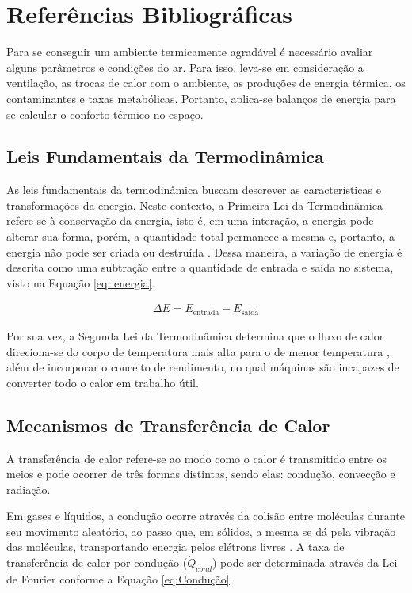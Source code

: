 \documentclass[acronym,symbols,table]{fei}
\begin{document}
\chapter{Referências Bibliográficas}

Para se conseguir um ambiente termicamente agradável é necessário avaliar alguns parâmetros e condições do ar. Para isso, leva-se em consideração a ventilação, as trocas de calor com o ambiente, as produções de energia térmica, os contaminantes e taxas metabólicas. Portanto, aplica-se balanços de energia para se calcular o conforto térmico no espaço.

\section{Leis Fundamentais da Termodinâmica} 

As leis fundamentais da termodinâmica buscam descrever as características e transformações da energia. Neste contexto, a Primeira Lei da Termodinâmica refere-se à conservação da energia, isto é, em uma interação, a energia pode alterar sua forma, porém, a quantidade total permanece a mesma e, portanto, a energia não pode ser criada ou destruída \cite{cengel1998heat}. Dessa maneira, a variação de energia é descrita como uma subtração entre a quantidade de entrada e saída no sistema, visto na Equação \ref{eq: energia}.

\begin{equation} \label{eq: energia}
    \begin{aligned}
    \Delta E = E_{\text{entrada}} - E_{\text{saída}}
    \end{aligned}
\end{equation}


Por sua vez, a Segunda Lei da Termodinâmica determina que o fluxo de calor direciona-se do corpo de temperatura mais alta para o de menor temperatura \cite{cengel1998heat}, além de incorporar o conceito de rendimento, no qual máquinas são incapazes de converter todo o calor em trabalho útil.

\section{Mecanismos de Transferência de Calor} 

A transferência de calor refere-se ao modo como o calor é transmitido entre os meios e pode ocorrer de três formas distintas, sendo elas: condução, convecção e radiação.

Em gases e líquidos, a condução ocorre através da colisão entre moléculas durante seu movimento aleatório, ao passo que, em sólidos, a mesma se dá pela vibração das moléculas, transportando energia pelos elétrons livres \cite{cengel1998heat}. A taxa de transferência de calor por condução ($\dot{Q}_{cond}$) pode ser determinada através da Lei de Fourier conforme a Equação \ref{eq:Condução}.
\end{document}

